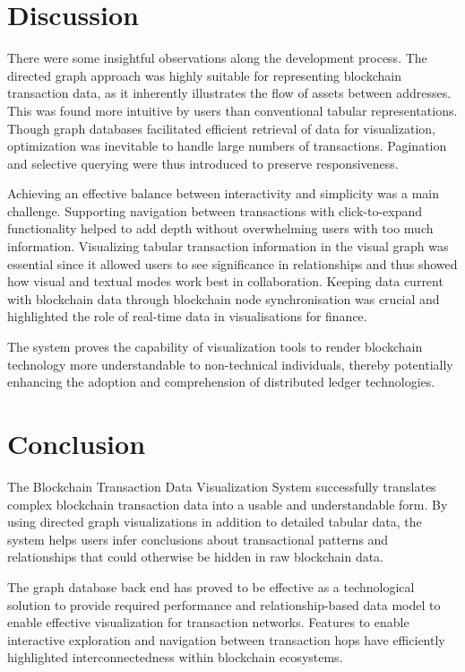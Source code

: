 \section{Discussion}
There were some insightful observations along the development process. The directed graph approach was highly suitable for representing blockchain transaction data, as it inherently illustrates the flow of assets between addresses. This was found more intuitive by users than conventional tabular representations. Though graph databases facilitated efficient retrieval of data for visualization, optimization was inevitable to handle large numbers of transactions. Pagination and selective querying were thus introduced to preserve responsiveness.

Achieving an effective balance between interactivity and simplicity was a main challenge. Supporting navigation between transactions with click-to-expand functionality helped to add depth without overwhelming users with too much information. Visualizing tabular transaction information in the visual graph was essential since it allowed users to see significance in relationships and thus showed how visual and textual modes work best in collaboration. Keeping data current with blockchain data through blockchain node synchronisation was crucial and highlighted the role of real-time data in visualisations for finance.

The system proves the capability of visualization tools to render blockchain technology more understandable to non-technical individuals, thereby potentially enhancing the adoption and comprehension of distributed ledger technologies.

\section{Conclusion}
The Blockchain Transaction Data Visualization System successfully translates complex blockchain transaction data into a usable and understandable form. By using directed graph visualizations in addition to detailed tabular data, the system helps users infer conclusions about transactional patterns and relationships that could otherwise be hidden in raw blockchain data.

The graph database back end has proved to be effective as a technological solution to provide required performance and relationship-based data model to enable effective visualization for transaction networks. Features to enable interactive exploration and navigation between transaction hops have efficiently highlighted interconnectedness within blockchain ecosystems.

